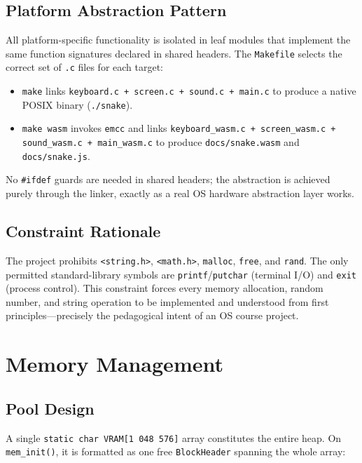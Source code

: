 \documentclass[conference]{IEEEtran}
\begin{document}
\subsection{Platform Abstraction Pattern}

All platform-specific functionality is isolated in leaf modules that implement
the same function signatures declared in shared headers. The \texttt{Makefile}
selects the correct set of \texttt{.c} files for each target:

\begin{itemize}
  \item \texttt{make} links \texttt{keyboard.c + screen.c + sound.c + main.c}
        to produce a native POSIX binary (\texttt{./snake}).
  \item \texttt{make wasm} invokes \texttt{emcc} and links
        \texttt{keyboard\_wasm.c + screen\_wasm.c + sound\_wasm.c +
        main\_wasm.c} to produce \texttt{docs/snake.wasm} and
        \texttt{docs/snake.js}.
\end{itemize}

No \texttt{\#ifdef} guards are needed in shared headers; the abstraction is
achieved purely through the linker, exactly as a real OS hardware abstraction
layer works.

\subsection{Constraint Rationale}

The project prohibits \texttt{<string.h>}, \texttt{<math.h>}, \texttt{malloc},
\texttt{free}, and \texttt{rand}. The only permitted standard-library symbols
are \texttt{printf}/\texttt{putchar} (terminal I/O) and \texttt{exit}
(process control). This constraint forces every memory allocation, random
number, and string operation to be implemented and understood from first
principles---precisely the pedagogical intent of an OS course project.

\section{Memory Management}

\subsection{Pool Design}

A single \texttt{static char VRAM[1\,048\,576]} array constitutes the entire
heap. On \texttt{mem\_init()}, it is formatted as one free \texttt{BlockHeader}
spanning the whole array:
\end{document}
